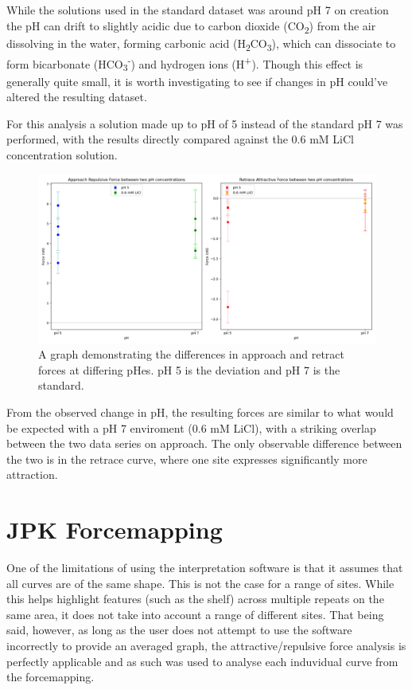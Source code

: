 While the solutions used in the standard dataset was around pH 7 on creation the pH can drift to slightly acidic due to carbon dioxide (CO\textsubscript{2}) from the air dissolving in the water, forming carbonic acid (H\textsubscript{2}CO\textsubscript{3}), which can dissociate to form bicarbonate (HCO\textsubscript{3}\textsuperscript{-}) and hydrogen ions (H\textsuperscript{+}). Though this effect is generally quite small, it is worth investigating to see if changes in pH could've altered the resulting dataset.

For this analysis a solution made up to pH of 5 instead of the standard pH 7 was performed, with the results directly compared against the 0.6 mM LiCl concentration solution. 

\begin{figure}[h!]
\centering
\includegraphics[width=\textwidth]{chapter7/pH/Overall image.png}
\caption{A graph demonstrating the differences in approach and retract forces at differing pHes. pH 5 is the deviation and pH 7 is the standard.}
\label{fig:pHOverall}
\end{figure}

From the observed change in pH, the resulting forces are similar to what would be expected with a pH 7 enviroment (0.6 mM LiCl), with a striking overlap between the two data series on approach. The only observable difference between the two is in the retrace curve, where one site expresses significantly more attraction.


\newpage
\section{JPK Forcemapping}

One of the limitations of using the interpretation software is that it assumes that all curves are of the same shape. This is not the case for a range of sites. While this helps highlight features (such as the shelf) across multiple repeats on the same area, it does not take into account a range of different sites. That being said, however, as long as the user does not attempt to use the software incorrectly to provide an averaged graph, the attractive/repulsive force analysis is perfectly applicable and as such was used to analyse each induvidual curve from the forcemapping.

